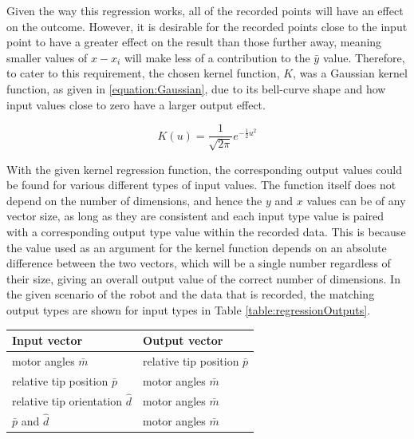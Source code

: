 \documentclass[11pt]{article}
\begin{document}
Given the way this regression works, all of the recorded points will have an effect on the outcome. However, it is desirable for the recorded points close to the input point to have a greater effect on the result than those further away, meaning smaller values of $x - x_{i}$ will make less of a contribution to the $\bar{y}$ value. Therefore, to cater to this requirement, the chosen kernel function, $K$, was a Gaussian kernel function, as given in \eqref{equation:Gaussian}, due to its bell-curve shape and how input values close to zero have a larger output effect.

\begin{equation}\label{equation:Gaussian}
K(u) = \frac{1}{\sqrt{2\pi}}e^{-\frac{1}{2}u^2}
\end{equation}

With the given kernel regression function, the corresponding output values could be found for various different types of input values. The function itself does not depend on the number of dimensions, and hence the $y$ and $x$ values can be of any vector size, as long as they are consistent and each input type value is paired with a corresponding output type value within the recorded data. This is because the value used as an argument for the kernel function depends on an absolute difference between the two vectors, which will be a single number regardless of their size, giving an overall output value of the correct number of dimensions. In the given scenario of the robot and the data that is recorded, the matching output types are shown for input types in Table \ref{table:regressionOutputs}.

\begin{center}
\label{table:regressionOutputs}
\begin{tabularx}{0.66\textwidth}{ | >{\centering\arraybackslash}p{12em} |>{\centering\arraybackslash}X|} 
\hline
Input vector & Output vector\\
\hline
motor angles $\bar{m}$ & relative tip position $\bar{p}$ \\
relative tip position $\bar{p}$ & motor angles $\bar{m}$ \\
relative tip orientation $\hat{d}$ & motor angles $\bar{m}$ \\
$\bar{p}$ and $\hat{d}$ & motor angles $\bar{m}$\\
\hline
\end{tabularx}
\end{center}
\end{document}
